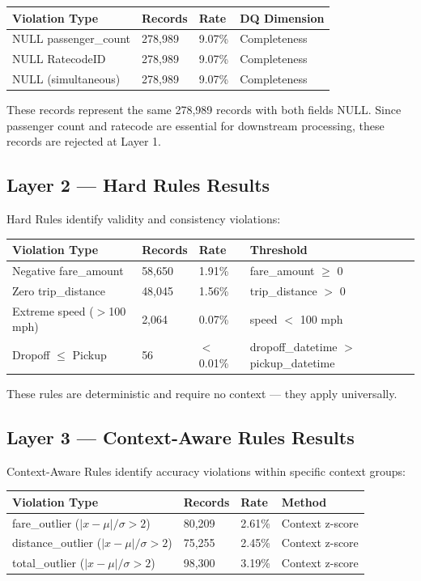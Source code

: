 \begin{longtable}{|m{5cm}|R{2.5cm}|R{2cm}|m{3.5cm}|}
\hline
\textbf{Violation Type} & \textbf{Records} & \textbf{Rate} & \textbf{DQ Dimension} \\ \hline
NULL passenger\_count & 278,989 & 9.07\% & Completeness \\ \hline
NULL RatecodeID & 278,989 & 9.07\% & Completeness \\ \hline
NULL (simultaneous) & 278,989 & 9.07\% & Completeness \\ \hline
\end{longtable}

These records represent the same 278,989 records with both fields NULL. Since passenger count and ratecode are essential for downstream processing, these records are rejected at Layer 1.

\subsection{Layer 2 --- Hard Rules Results}

Hard Rules identify validity and consistency violations:

\begin{longtable}{|m{5cm}|R{2.5cm}|R{2cm}|m{3cm}|}
\hline
\textbf{Violation Type} & \textbf{Records} & \textbf{Rate} & \textbf{Threshold} \\ \hline
Negative fare\_amount & 58,650 & 1.91\% & fare\_amount $\geq$ 0 \\ \hline
Zero trip\_distance & 48,045 & 1.56\% & trip\_distance $>$ 0 \\ \hline
Extreme speed ($>$100 mph) & 2,064 & 0.07\% & speed $<$ 100 mph \\ \hline
Dropoff $\leq$ Pickup & 56 & $<$0.01\% & dropoff\_datetime $>$ pickup\_datetime \\ \hline
\end{longtable}

These rules are deterministic and require no context --- they apply universally.

\subsection{Layer 3 --- Context-Aware Rules Results}

Context-Aware Rules identify accuracy violations within specific context groups:

\begin{longtable}{|m{5cm}|R{2.5cm}|R{2cm}|m{3cm}|}
\hline
\textbf{Violation Type} & \textbf{Records} & \textbf{Rate} & \textbf{Method} \\ \hline
fare\_outlier ($|x-\mu|/\sigma > 2$) & 80,209 & 2.61\% & Context z-score \\ \hline
distance\_outlier ($|x-\mu|/\sigma > 2$) & 75,255 & 2.45\% & Context z-score \\ \hline
total\_outlier ($|x-\mu|/\sigma > 2$) & 98,300 & 3.19\% & Context z-score \\ \hline
\end{longtable}

